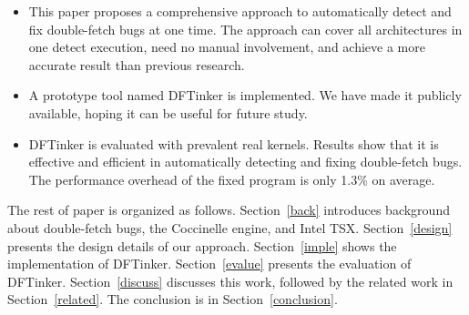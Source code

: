 \documentclass[10pt]{llncs}
\begin{document}


\begin{itemize}
\item  This paper proposes a comprehensive approach to automatically detect and fix double-fetch bugs at one time.  %
The approach can cover all architectures in one detect execution, need no manual involvement, and achieve a more accurate result than previous research. 
 
\item A prototype tool named DFTinker is implemented. We have made it publicly available, hoping it can be useful for future study.

\item  DFTinker is evaluated with prevalent real kernels. Results show that it is effective and efficient in automatically detecting and fixing double-fetch bugs. The performance overhead of the fixed program is only 1.3\% on average.


\end{itemize}
The rest of paper is organized as follows. Section~\ref{back} introduces background about double-fetch bugs, the Coccinelle engine, and Intel TSX. Section~\ref{design} presents the design details of our approach. %
Section~\ref{imple} shows the implementation of DFTinker. %
Section~\ref{evalue} presents the evaluation of DFTinker. %
Section~\ref{discuss} discusses this work, followed by the related work in Section~\ref{related}. The conclusion is in Section~\ref{conclusion}.
\end{document}
